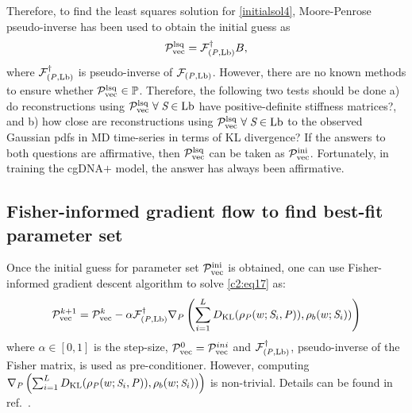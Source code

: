 Therefore, to find the least squares solution for \cref{initialsol4}, Moore-Penrose pseudo-inverse has been used to obtain the initial guess as
\begin{equation}
\begin{split}
{\mathcal P}_\text{vec}^{\text{lsq}} = {\mathcal F}_{({\mathit{P}},{\text{Lb}})}^{\dagger}B, 
\end{split}
\label{initialsol5}
\end{equation}
where ${\mathcal F}_{({\mathit{P}},{\text{Lb}})}^{\dagger}$ is pseudo-inverse of ${\mathcal F}_{({\mathit{P}},{\text{Lb}})}$. 
However, there are no known methods to ensure whether ${\mathcal P}_\text{vec}^{\text{lsq}} \in {\mathbb P}$. 
Therefore, the following two tests should be done a) do reconstructions using ${\mathcal P}_\text{vec}^{\text{lsq}} \; \forall \; {\textit{S}} \in {\text{Lb}}$ have positive-definite stiffness matrices?, 
and b) how close are reconstructions using ${\mathcal P}_\text{vec}^{\text{lsq}} \; \forall \; {\textit{S}} \in {\text{Lb}}$ to the observed Gaussian pdfs in MD time-series in terms of KL divergence? 
If the answers to both questions are affirmative, then ${\mathcal P}_\text{vec}^{\text{lsq}}$ can be taken as ${\mathcal P}_\text{vec}^{\text{ini}}$.
Fortunately, in training the cgDNA$+$ model, the answer has always been affirmative.

\subsection{Fisher-informed gradient flow to find best-fit parameter set}\label{c2:s4:sb5}
Once the initial guess for parameter set ${\mathcal P}_\text{vec}^{\text{ini}}$ is obtained, one can use Fisher-informed gradient descent algorithm to solve \cref{c2:eq17} as:
\begin{equation}
{\mathcal P}_\text{vec}^{k+1} = {\mathcal P}_\text{vec}^{k} -\alpha{\mathcal F}_{({\mathit{P}},{\text{Lb}})}^{\dagger} \nabla_P\left(\sum_{i=1}^{L} D_{\text{KL}}(\rho_{{\mathit{P}}}(w;{\textit{S}}_i, {\mathit{P}})),\rho_{b}(w;{\textit{S}}_i))\right)
\label{gradflow}
\end{equation}
where $\alpha \in [0,1]$ is the step-size, ${\mathcal P}_\text{vec}^{0} = {\mathcal P}_\text{vec}^{ini}$ and ${\mathcal F}_{({\mathit{P}},{\text{Lb}})}^{\dagger}$, pseudo-inverse of the Fisher matrix, is used as pre-conditioner.
However, computing $\small{\nabla_{{\mathit{P}}}\left(\sum_{i=1}^{L}D_{\text{KL}}(\rho_{{\mathit{P}}}(w;{\textit{S}}_i,{\mathit{P}})),\rho_{b}(w;{\textit{S}}_i))\right)}$ is non-trivial. 
Details can be found in ref.~\cite{patelithesis}.

